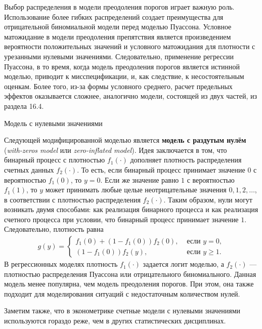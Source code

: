 Выбор распределения в модели преодоления порогов играет важную роль. Использование более гибких распределений создает преимущества для отрицательной биномиальной модели перед моделью Пуассона. Условное матожидание в модели преодоления препятствия является произведением вероятности положительных значений и условного матожидания для плотности с урезанными нулевыми значениями. Следовательно, применение регрессии Пуассона, в то время, когда модель преодоления порогов является истинной моделью, приводит к мисспецификации, и, как следствие, к несостоятельным оценкам. Более того, из-за формы условного среднего, расчет предельных эффектов оказывается сложнее, аналогично модели, состоящей из двух частей, из раздела 16.4.

        \begin{center}{Модель с нулевыми значениями}\end{center}
\noindent
Следующей модифицированной моделью является \textbf{модель с раздутым нулём} (\textit{with-zeros model} или \textit{zero-inflated model}). Идея заключается в том, что бинарный процесс с плотностью $f_1(\cdot)$ дополняет плотность распределения счетных данных $f_2(\cdot)$. То есть, если бинарный процесс принимает значение $0$ с вероятностью $f_1(0)$, то $y = 0$. Если же значение равно $1$ с вероятностью $f_1(1)$, то $y$ может принимать любые целые неотрицательные значения $0, 1, 2, \ldots $, в соответствии с плотностью распределения $f_2(\cdot)$. Таким образом, нули могут возникать двумя способами: как реализация бинарного процесса и как реализация счетного процесса при условии, что бинарный процесс принимает значение $1$. Следовательно, плотность равна
    \begin{align}\label{eq:20.19}
    g(y) =\begin{cases}
                f_1(0) + (1 - f_1(0)) f_2(0),              & \text{ если }y = 0, \\
                (1 - f_1(0))f_2(y),                        & \text{ если }y \ge 1.
                \end{cases}
    \end{align}
В регрессионных моделях плотность $f_1(\cdot)$ задается логит моделью, а $f_2(\cdot)$ --- плотностью распределения Пуассона или отрицательного биномиального. Данная модель менее популярна, чем модель преодоления порогов. При этом, она также подходит для моделирования ситуаций с недостаточным количеством нулей.

Заметим также, что в эконометрике счетные модели с нулевыми значениями используются гораздо реже, чем в других статистических дисциплинах.



